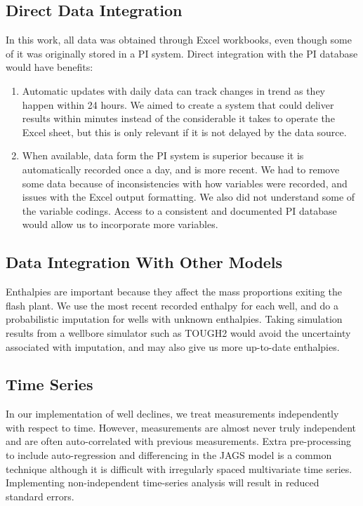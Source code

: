 \documentclass[a4paper, 12pt]{article}
\begin{document}
\subsection{Direct Data Integration}
In this work, all data was obtained through Excel workbooks, even though some of it was originally stored in a PI system. Direct integration with the PI database would have benefits:

\begin{enumerate}
\item Automatic updates with daily data can track changes in trend as they happen within 24 hours.  We aimed to create a system that could deliver results within minutes instead of the considerable it takes to operate the Excel sheet, but this is only relevant if it is not delayed by the data source.
\item When available, data form the PI system is superior because it is automatically recorded once a day, and is more recent. We had to remove some data because of inconsistencies with how variables were recorded, and issues with the Excel output formatting. We also did not understand some of the variable codings. Access to a consistent and documented PI database would allow us to incorporate more variables.
\end{enumerate}

\subsection{Data Integration With Other Models}
Enthalpies are important because they affect the mass proportions exiting the flash plant. We use the most recent recorded enthalpy for each well, and do a probabilistic imputation for wells with unknown enthalpies. Taking simulation results from a wellbore simulator such as TOUGH2 would avoid the uncertainty associated with imputation, and may also give us more up-to-date enthalpies.

\subsection{Time Series}
In our implementation of well declines, we treat measurements independently with respect to time. However, measurements are almost never truly independent and are often auto-correlated with previous measurements. Extra pre-processing to include auto-regression and differencing in the JAGS model is a common technique although it is difficult with irregularly spaced multivariate time series. Implementing non-independent time-series analysis will result in reduced standard errors.
\end{document}
